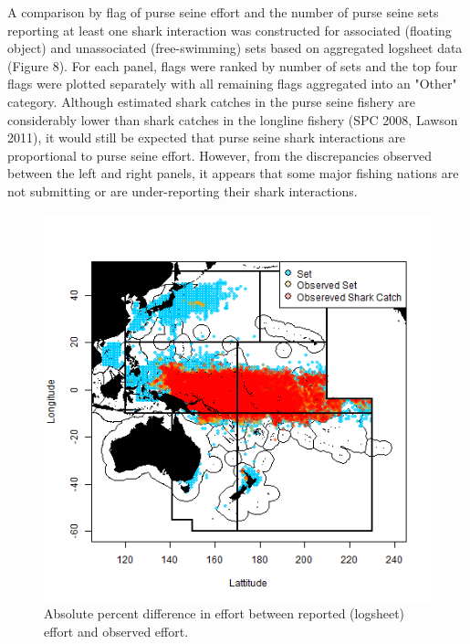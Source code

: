\documentclass[12pt]{SCreport}
\begin{document}
A comparison by flag of purse seine effort and the number of purse seine sets reporting at least one shark interaction was constructed for associated (floating object) and unassociated (free-swimming) sets based on aggregated logsheet data (Figure 8).  For each panel, flags were ranked by number of sets and the top four flags were plotted separately with all remaining flags aggregated into an "Other" category. Although estimated shark catches in the purse seine fishery are considerably lower than shark catches in the longline fishery (SPC 2008, Lawson 2011), it would still be expected that purse seine shark interactions are proportional to purse seine effort. However, from the discrepancies observed between the left and right panels, it appears that some major fishing nations are not submitting or are under-reporting their shark interactions.


\begin{figure}
\begin{center}
\includegraphics[scale=0.75]{../GRAPHICS/Defined/FIG_07_PS_sets}
\caption{\label{fig:regions} Absolute percent difference in effort between reported (logsheet)  effort and observed effort.}
\end{center}
\end{figure}
\end{document}
